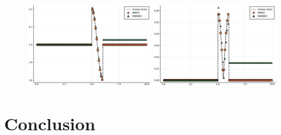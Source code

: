 \documentclass[12pt]{article}
\begin{document}
\begin{figure}[!htb]
    \centering
    \includegraphics[width=0.49\textwidth]{Figures/mean_dc_sgwb}
    \includegraphics[width=0.49\textwidth]{Figures/sd_dc_sgwb}
    \caption{}
    \label{fig:b2}
\end{figure}




\section{Conclusion}

\clearpage
\printbibliography
\end{document}
